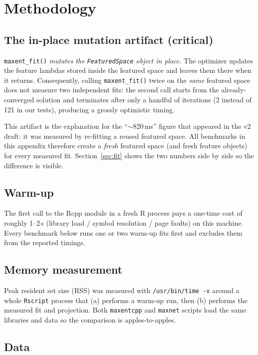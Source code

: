 \section{Methodology}

\subsection{The in-place mutation artifact (critical)}

\texttt{maxent\_fit()} \emph{mutates the \texttt{FeaturedSpace} object
in place}.  The optimizer updates the feature lambdas stored inside the
featured space and leaves them there when it returns.  Consequently,
calling \texttt{maxent\_fit()} twice on the \emph{same} featured space
does not measure two independent fits: the second call starts from the
already-converged solution and terminates after only a handful of
iterations (2 instead of 121 in our tests), producing a grossly
optimistic timing.

This artifact is the explanation for the ``$\sim$820\,ms'' figure that
appeared in the v2 draft: it was measured by re-fitting a reused
featured space.  All benchmarks in this appendix therefore create a
\emph{fresh} featured space (and fresh feature objects) for every
measured fit.  Section~\ref{sec:fit} shows the two numbers side by
side so the difference is visible.

\subsection{Warm-up}

The first call to the Rcpp module in a fresh R process pays a one-time
cost of roughly 1--2\,s (library load / symbol resolution / page
faults) on this machine.  Every benchmark below runs one or two
warm-up fits first and excludes them from the reported timings.

\subsection{Memory measurement}

Peak resident set size (RSS) was measured with
\texttt{/usr/bin/time -v} around a whole \texttt{Rscript} process that
(a) performs a warm-up run, then (b) performs the measured fit and
projection.  Both \texttt{maxentcpp} and \texttt{maxnet} scripts load
the same libraries and data so the comparison is apples-to-apples.

\subsection{Data}

